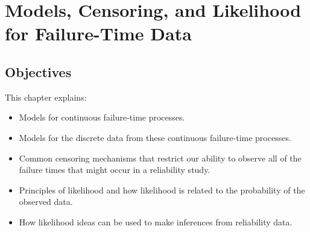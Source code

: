 \setcounter{chapter}{1}
\chapter{Models, Censoring, and Likelihood for Failure-Time Data}
\label{chapter:np.models.censoring.likelihood}





\section*{Objectives}
This chapter explains:
\begin{itemize} 
\item 
Models for continuous failure-time processes.
\item 
Models for the discrete data from
these continuous failure-time processes.
\item 
Common censoring mechanisms that restrict our ability to
observe all of the failure times that might occur in a reliability study.
\item 
Principles of likelihood and how likelihood  is related to the
probability of the observed data.
\item 
How likelihood ideas can be used
to make inferences from reliability data.
\end{itemize}

